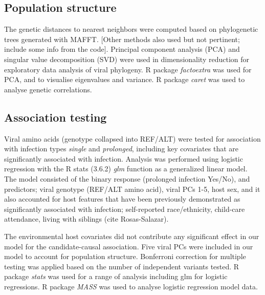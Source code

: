 \documentclass{article} %
\begin{document}
\subsection{Population structure}
The genetic distances to nearest neighbors were computed based on phylogenetic 
trees generated with MAFFT.
[Other methods also used but not pertinent; include some info from the code].
Principal component analysis (PCA) and singular value decomposition (SVD) were used in dimensionality reduction for exploratory data analysis of viral phylogeny.
R package \textit{factoextra} was used for PCA, and to visualise eigenvalues and variance. 
R package \textit{caret} was used to analyse genetic correlations.

\subsection{Association testing}
Viral amino acids (genotype collapsed into REF/ALT) were tested for association with infection types \textit{single} and \textit{prolonged}, 
including key covariates that are significantly associated with infection.
Analysis was performed using logistic regression with the
R stats (3.6.2) \textit{glm} function as a generalized linear model.
The model consisted of the binary response (prolonged infection Yes/No), and predictors; viral genotype (REF/ALT amino acid), viral PCs 1-5, host sex, and it also accounted for host features that have been previously demonstrated as significantly associated with infection; 
self-reported race/ethnicity, child-care attendance, living with siblings (cite Rosas-Salazar).


The environmental host covariates did not contribute any significant effect in our model for the candidate-causal association.
Five viral PCs were included in our model to account for population structure.
Bonferroni correction for multiple testing was applied based on the number of independent variants tested.
R package \textit{stats} was used for a range of analysis including glm for logistic regressions. 
R package \textit{MASS} was used to analyse logistic regression model data.
\end{document}
